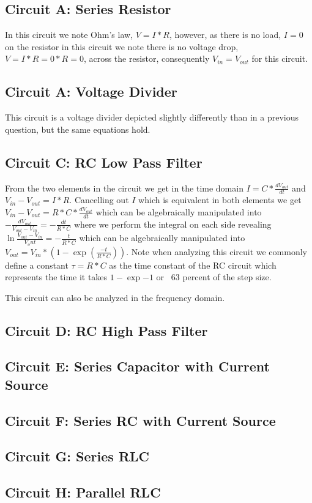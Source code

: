 \documentclass[main.tex]{subfiles}
\begin{document}
\subsection{Circuit A: Series Resistor}
In this circuit we note Ohm's law, $V = I * R$, however, as there is no load, $I=0$ on the resistor in this circuit we note there is no voltage drop, $V=I*R=0*R=0$, across the resistor, consequently $V_{in} = V_{out}$ for this circuit. 


\subsection{Circuit A: Voltage Divider}
This circuit is a voltage divider depicted slightly differently than in a previous question, but the same equations hold. 


\subsection{Circuit C: RC Low Pass Filter}
From the two elements in the circuit we get in the time domain $I = C * \frac{dV_{out}}{dt}$ and $V_{in} - V_{out} = I * R$. Cancelling out $I$ which is equivalent in both elements we get $V_{in} - V_{out} = R * C * \frac{dV_{out}}{dt}$ which can be algebraically manipulated into $-\frac{dV_{out}}{V_{out}-V_{in}} = -\frac{dt}{R*C}$ where we perform the integral on each side revealing $\ln{\frac{V_{out}-V_{in}}{V_out}}=-\frac{t}{R*C}$ which can be algebraically manipulated into $V_{out}=V_{in}*(1-\exp(\frac{-t}{R*C}))$. Note when analyzing this circuit we commonly define a constant $\tau = R * C$ as the time constant of the RC circuit which represents the time it takes $1-\exp{-1}$ or ~63 percent of the step size. 


This circuit can also be analyzed in the frequency domain. 



\subsection{Circuit D: RC High Pass Filter}

\subsection{Circuit E: Series Capacitor with Current Source}

\subsection{Circuit F: Series RC with Current Source}

\subsection{Circuit G: Series RLC}

\subsection{Circuit H: Parallel RLC}
\end{document}
